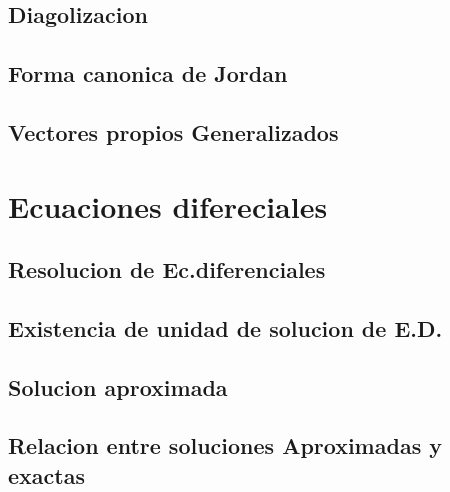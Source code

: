 \documentclass[letterpaper,12pt]{report}
\begin{document}
    \chapter{Diagolizacion}
    \chapter{Forma canonica de Jordan}
    \chapter{Vectores propios Generalizados}
  \part{Ecuaciones difereciales} 
    \chapter{Resolucion de Ec.diferenciales}
    \chapter{Existencia de unidad de solucion de E.D.}
    \chapter{Solucion aproximada}
    \chapter{Relacion entre soluciones Aproximadas y exactas}
\end{document}
